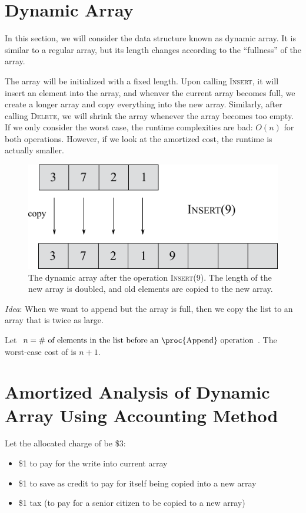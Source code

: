 \section{Dynamic Array}

In this section, we will consider the data structure known as dynamic array. It is similar to a regular array, but its length changes according to the ``fullness'' of the array.


The array will be initialized with a fixed length. Upon calling \textsc{Insert}, it will insert an element into the array, and whenver the current array becomes full, we create a longer array and copy everything into the new array. Similarly, after calling \textsc{Delete}, we will shrink the array whenever the array becomes too empty. If we only consider the worst case, the runtime complexities are bad: $O(n)$ for both operations. However, if we look at the amortized cost, the runtime is actually smaller.

\begin{figure}[htbp]
    \includegraphics[width=0.4\linewidth]{figures/dynamic_arr_append.pdf}

    \hfill

    \caption[width=0.5\linewidth]{The dynamic array after the operation \textsc{Insert}(9). The length of the new array is doubled, and old elements are copied to the new array.}
\end{figure}

\textit{Idea}: When we want to append but the array is full, then we copy the list to an array that is twice as large.

Let $n = \text{\# of elements in the list before an \proc{Append} operation}$. The worst-case cost of  is $n+1$.

\section{Amortized Analysis of Dynamic Array Using Accounting Method}
Let the allocated charge of  be \$3:
\begin{itemize}
    \item \$1 to pay for the write into current array
    \item \$1 to save as credit to pay for itself being copied into a new array
    \item \$1 tax (to pay for a senior citizen to be copied to a new array)
\end{itemize}

